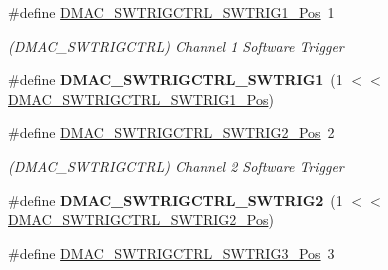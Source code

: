 \begin{DoxyCompactItemize}
\item 
\hypertarget{group___s_a_m_l21___d_m_a_c_gaef347c4c8af907245a83b5d099339e30}{}\#define \hyperlink{group___s_a_m_l21___d_m_a_c_gaef347c4c8af907245a83b5d099339e30}{D\+M\+A\+C\+\_\+\+S\+W\+T\+R\+I\+G\+C\+T\+R\+L\+\_\+\+S\+W\+T\+R\+I\+G1\+\_\+\+Pos}~1\label{group___s_a_m_l21___d_m_a_c_gaef347c4c8af907245a83b5d099339e30}

\begin{DoxyCompactList}\small\item\em (D\+M\+A\+C\+\_\+\+S\+W\+T\+R\+I\+G\+C\+T\+R\+L) Channel 1 Software Trigger \end{DoxyCompactList}\item 
\hypertarget{group___s_a_m_l21___d_m_a_c_ga3dd0447ef72a3087d7936fc2ee1da4b3}{}\#define {\bfseries D\+M\+A\+C\+\_\+\+S\+W\+T\+R\+I\+G\+C\+T\+R\+L\+\_\+\+S\+W\+T\+R\+I\+G1}~(1 $<$$<$ \hyperlink{group___s_a_m_l21___d_m_a_c_gaef347c4c8af907245a83b5d099339e30}{D\+M\+A\+C\+\_\+\+S\+W\+T\+R\+I\+G\+C\+T\+R\+L\+\_\+\+S\+W\+T\+R\+I\+G1\+\_\+\+Pos})\label{group___s_a_m_l21___d_m_a_c_ga3dd0447ef72a3087d7936fc2ee1da4b3}

\item 
\hypertarget{group___s_a_m_l21___d_m_a_c_ga1913259e7e96e88875374e1662761850}{}\#define \hyperlink{group___s_a_m_l21___d_m_a_c_ga1913259e7e96e88875374e1662761850}{D\+M\+A\+C\+\_\+\+S\+W\+T\+R\+I\+G\+C\+T\+R\+L\+\_\+\+S\+W\+T\+R\+I\+G2\+\_\+\+Pos}~2\label{group___s_a_m_l21___d_m_a_c_ga1913259e7e96e88875374e1662761850}

\begin{DoxyCompactList}\small\item\em (D\+M\+A\+C\+\_\+\+S\+W\+T\+R\+I\+G\+C\+T\+R\+L) Channel 2 Software Trigger \end{DoxyCompactList}\item 
\hypertarget{group___s_a_m_l21___d_m_a_c_gacb6bbf77bf4630410122a08cdf37019d}{}\#define {\bfseries D\+M\+A\+C\+\_\+\+S\+W\+T\+R\+I\+G\+C\+T\+R\+L\+\_\+\+S\+W\+T\+R\+I\+G2}~(1 $<$$<$ \hyperlink{group___s_a_m_l21___d_m_a_c_ga1913259e7e96e88875374e1662761850}{D\+M\+A\+C\+\_\+\+S\+W\+T\+R\+I\+G\+C\+T\+R\+L\+\_\+\+S\+W\+T\+R\+I\+G2\+\_\+\+Pos})\label{group___s_a_m_l21___d_m_a_c_gacb6bbf77bf4630410122a08cdf37019d}

\item 
\hypertarget{group___s_a_m_l21___d_m_a_c_ga116d94d4f4ed98c7f47fb91ee911ca1e}{}\#define \hyperlink{group___s_a_m_l21___d_m_a_c_ga116d94d4f4ed98c7f47fb91ee911ca1e}{D\+M\+A\+C\+\_\+\+S\+W\+T\+R\+I\+G\+C\+T\+R\+L\+\_\+\+S\+W\+T\+R\+I\+G3\+\_\+\+Pos}~3\label{group___s_a_m_l21___d_m_a_c_ga116d94d4f4ed98c7f47fb91ee911ca1e}


\end{DoxyCompactItemize}
